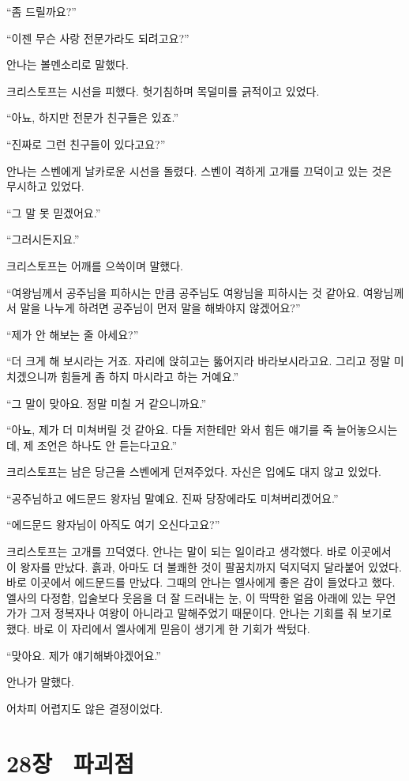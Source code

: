 `` 좀 드릴까요?''

``이젠 무슨 사랑 전문가라도 되려고요?''

안나는 볼멘소리로 말했다.

크리스토프는 시선을 피했다. 헛기침하며 목덜미를 긁적이고 있었다.

``아뇨, 하지만 전문가 친구들은 있죠.''

``진짜로 그런 친구들이 있다고요?''

안나는 스벤에게 날카로운 시선을 돌렸다. 스벤이 격하게 고개를 끄덕이고 있는 것은 무시하고 있었다.

``그 말 못 믿겠어요.''

``그러시든지요.''

크리스토프는 어깨를 으쓱이며 말했다.

``여왕님께서 공주님을 피하시는 만큼 공주님도 여왕님을 피하시는 것 같아요. 여왕님께서 말을 나누게 하려면 공주님이 먼저 말을 해봐야지 않겠어요?''

``제가 안 해보는 줄 아세요?''

``더 크게 해 보시라는 거죠. 자리에 앉히고는 뚫어지라 바라보시라고요. 그리고 정말 미치겠으니까 힘들게 좀 하지 마시라고 하는 거예요.''

``그 말이 맞아요. 정말 미칠 거 같으니까요.''

``아뇨, 제가 더 미쳐버릴 것 같아요. 다들 저한테만 와서 힘든 얘기를 죽 늘어놓으시는데, 제 조언은 하나도 안 듣는다고요.''

크리스토프는 남은 당근을 스벤에게 던져주었다. 자신은 입에도 대지 않고 있었다.

``공주님하고 에드문드 왕자님 말예요. 진짜 당장에라도 미쳐버리겠어요.''

``에드문드 왕자님이 아직도 여기 오신다고요?''

크리스토프는 고개를 끄덕였다. 안나는 말이 되는 일이라고 생각했다. 바로 이곳에서 이 왕자를 만났다. 흙과, 아마도 더 불쾌한 것이 팔꿈치까지 덕지덕지 달라붙어 있었다. 바로 이곳에서 에드문드를 만났다. 그때의 안나는 엘사에게 좋은 감이 들었다고 했다. 엘사의 다정함, 입술보다 웃음을 더 잘 드러내는 눈, 이 딱딱한 얼음 아래에 있는 무언가가 그저 정복자나 여왕이 아니라고 말해주었기 때문이다. 안나는 기회를 줘 보기로 했다. 바로 이 자리에서 엘사에게 믿음이 생기게 한 기회가 싹텄다.

``맞아요. 제가 얘기해봐야겠어요.''

안나가 말했다.

어차피 어렵지도 않은 결정이었다.



\chapter[28장  파괴점][28장\hspace*{.5em}파괴점]{28장 \ 파괴점}



